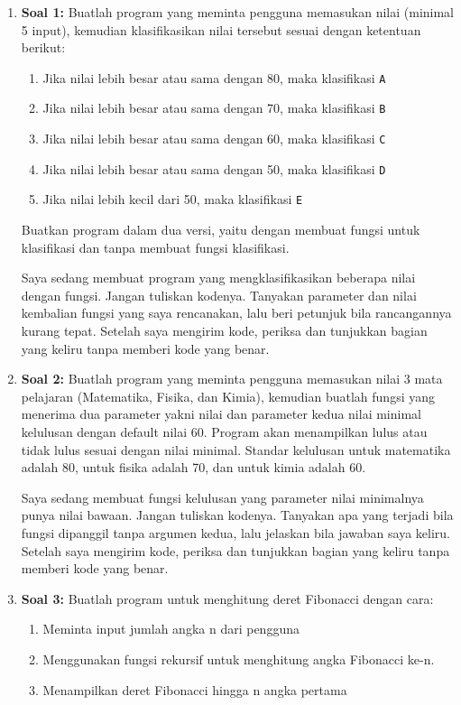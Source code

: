 \begin{enumerate}
    \item \textbf{Soal 1:} Buatlah program yang meminta pengguna memasukan nilai (minimal 5 input), kemudian klasifikasikan nilai tersebut sesuai dengan ketentuan berikut:
    \begin{enumerate}
        \item Jika nilai lebih besar atau sama dengan 80, maka klasifikasi \texttt{A}
        \item Jika nilai lebih besar atau sama dengan 70, maka klasifikasi \texttt{B}
        \item Jika nilai lebih besar atau sama dengan 60, maka klasifikasi \texttt{C}
        \item Jika nilai lebih besar atau sama dengan 50, maka klasifikasi \texttt{D}
        \item Jika nilai lebih kecil dari 50, maka klasifikasi \texttt{E}
    \end{enumerate}
    Buatkan program dalam dua versi, yaitu dengan membuat fungsi untuk klasifikasi dan tanpa membuat fungsi klasifikasi.

      \begin{promptterarah}
      Saya sedang membuat program yang mengklasifikasikan beberapa nilai dengan fungsi. Jangan tuliskan kodenya. Tanyakan parameter dan nilai kembalian fungsi yang saya rencanakan, lalu beri petunjuk bila rancangannya kurang tepat. Setelah saya mengirim kode, periksa dan tunjukkan bagian yang keliru tanpa memberi kode yang benar.
      \end{promptterarah}
    \item \textbf{Soal 2:} Buatlah program yang meminta pengguna memasukan nilai 3 mata pelajaran (Matematika, Fisika, dan Kimia), kemudian buatlah fungsi yang menerima dua parameter yakni nilai dan parameter kedua nilai minimal kelulusan dengan default nilai 60. Program akan menampilkan lulus atau tidak lulus sesuai dengan nilai minimal. Standar kelulusan untuk matematika adalah 80, untuk fisika adalah 70, dan untuk kimia adalah 60.

      \begin{promptterarah}
      Saya sedang membuat fungsi kelulusan yang parameter nilai minimalnya punya nilai bawaan. Jangan tuliskan kodenya. Tanyakan apa yang terjadi bila fungsi dipanggil tanpa argumen kedua, lalu jelaskan bila jawaban saya keliru. Setelah saya mengirim kode, periksa dan tunjukkan bagian yang keliru tanpa memberi kode yang benar.
      \end{promptterarah}
    \item \textbf{Soal 3:} Buatlah program untuk menghitung deret Fibonacci dengan cara:
    \begin{enumerate}
        \item Meminta input jumlah angka n dari pengguna
        \item Menggunakan fungsi rekursif untuk menghitung angka Fibonacci ke-n.
        \item Menampilkan deret Fibonacci hingga n angka pertama
    \end{enumerate}


\end{enumerate}
